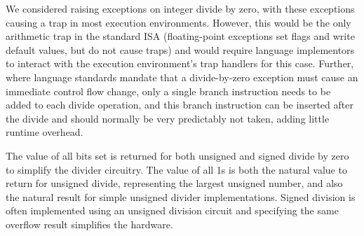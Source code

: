\begin{commentary}
We considered raising exceptions on integer divide by zero, with these
exceptions causing a trap in most execution environments.  However,
this would be the only arithmetic trap in the standard ISA
(floating-point exceptions set flags and write default values, but do
not cause traps) and would require language implementors to interact
with the execution environment's trap handlers for this case.
Further, where language standards mandate that a divide-by-zero
exception must cause an immediate control flow change, only a single
branch instruction needs to be added to each divide operation, and
this branch instruction can be inserted after the divide and should
normally be very predictably not taken, adding little runtime
overhead.

The value of all bits set is returned for both unsigned and signed
divide by zero to simplify the divider circuitry.  The value of all 1s
is both the natural value to return for unsigned divide, representing
the largest unsigned number, and also the natural result for simple
unsigned divider implementations.  Signed division is often
implemented using an unsigned division circuit and specifying the same
overflow result simplifies the hardware.
\end{commentary}

\begin{formalspec}
  \sailfclDIVexecute
  \sailfclREMexecute
\end{formalspec}
